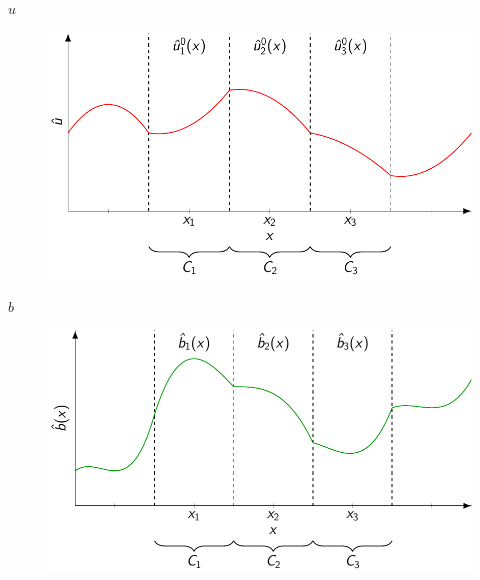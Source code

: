 \documentclass[pdf]{beamer}
\begin{document}
\begin{frame}{$\hat{u}$}
	\begin{figure}
		\includegraphics[width=1\textwidth]{./Pics/Tex/Reconstructions/P2.pdf}
	\end{figure}
\end{frame}
\begin{frame}{$\hat{b}$}
	\begin{figure}
		\includegraphics[width=1\textwidth]{./Pics/Tex/Reconstructions/P3.pdf}
	\end{figure}
\end{frame}
\end{document}
